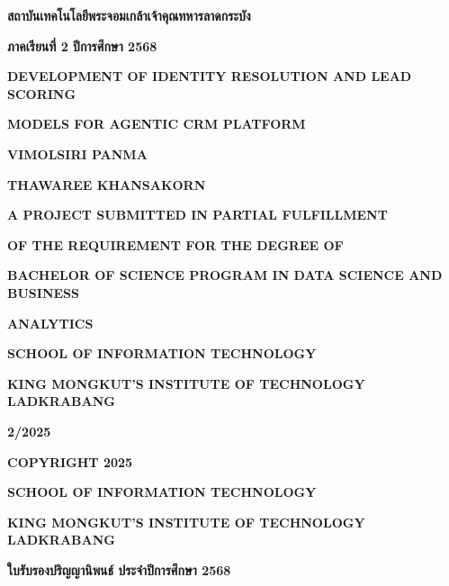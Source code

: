 \documentclass[12pt,a4paper]{report}
\begin{document}
\begin{center}\bfseries สถาบันเทคโนโลยีพระจอมเกล้าเจ้าคุณทหารลาดกระบัง\end{center}
\begin{center}\bfseries ภาคเรียนที่ 2 ปีการศึกษา 2568\end{center}
\clearpage
\begin{center}\bfseries DEVELOPMENT OF IDENTITY RESOLUTION AND LEAD SCORING\end{center}
\begin{center}\bfseries MODELS FOR AGENTIC CRM PLATFORM\end{center}
\begin{center}\bfseries VIMOLSIRI PANMA\end{center}
\begin{center}\bfseries THAWAREE KHANSAKORN\end{center}
\begin{center}\bfseries A PROJECT SUBMITTED IN PARTIAL FULFILLMENT\end{center}
\begin{center}\bfseries OF THE REQUIREMENT FOR THE DEGREE OF\end{center}
\begin{center}\bfseries BACHELOR OF SCIENCE PROGRAM IN DATA SCIENCE AND BUSINESS\end{center}
\begin{center}\bfseries ANALYTICS\end{center}
\begin{center}\bfseries SCHOOL OF INFORMATION TECHNOLOGY\end{center}
\begin{center}\bfseries KING MONGKUT’S INSTITUTE OF TECHNOLOGY LADKRABANG\end{center}
\begin{center}\bfseries 2/2025\end{center}
\clearpage
\begin{center}\bfseries COPYRIGHT 2025\end{center}
\begin{center}\bfseries SCHOOL OF INFORMATION TECHNOLOGY\end{center}
\begin{center}\bfseries KING MONGKUT’S INSTITUTE OF TECHNOLOGY LADKRABANG\end{center}
\clearpage
\begin{center}\bfseries ใบรับรองปริญญานิพนธ์ ประจําปีการศึกษา 2568\end{center}
\end{document}

